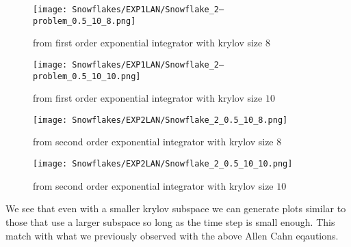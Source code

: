 \begin{figure}[H]
    \centering
    \begin{minipage}{0.49\textwidth}
        \texttt{[image: Snowflakes/EXP1LAN/Snowflake\_2--problem\_0.5\_10\_8.png]} %
        \caption{from first order exponential integrator with krylov size $8$}
        \label{fig:first order 8 0.5}
    \end{minipage}\hfill
    \centering
    \begin{minipage}{0.49\textwidth}
        \texttt{[image: Snowflakes/EXP1LAN/Snowflake\_2--problem\_0.5\_10\_10.png]} %
        \caption{from first order exponential integrator with krylov size $10$}
        \label{fig:first order 10 0.5}
    \end{minipage}\hfill
\end{figure}
\begin{figure}[H]
    \centering
    \begin{minipage}{0.49\textwidth}
        \texttt{[image: Snowflakes/EXP2LAN/Snowflake\_2\_0.5\_10\_8.png]} %
        \caption{from second order exponential integrator with krylov size $8$}
        \label{fig:second order 8 0.5}
    \end{minipage}\hfill
    \centering
    \begin{minipage}{0.49\textwidth}
        \texttt{[image: Snowflakes/EXP2LAN/Snowflake\_2\_0.5\_10\_10.png]} %
        \caption{from second order exponential integrator with krylov size $10$}
        \label{fig:second order 10 0.5}
    \end{minipage}\hfill
\end{figure}

We see that even with a smaller krylov subspace we can generate plots similar to those that use a larger subspace so long as the time step is small enough.
This match with what we previously observed with the above Allen Cahn eqautions.
